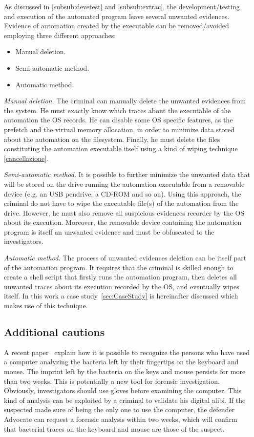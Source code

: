 \documentclass[runningheads,english]{llncs}
\begin{document}
{As discussed in \ref{subsub:devetest} and \ref{subsub:extrac}, the development/testing and execution of the automated program leave several unwanted evidences. Evidence of automation created by the executable can be removed/avoided employing three different approaches:
\begin{itemize}
\item Manual deletion.
\item Semi-automatic method.
\item Automatic method.
\end{itemize}

\noindent
{\em Manual deletion.} 
The criminal can manually delete the unwanted evidences from the system. He must exactly know which traces about the executable of the automation the OS records. He can disable some OS specific features, as the prefetch and the virtual memory allocation, in order to minimize data stored about the automation on the filesystem. Finally, he must delete the files constituting the automation executable itself using a kind of wiping technique \ref{cancellazione}.

\noindent
{\em Semi-automatic method.} %
It is possible to further minimize the unwanted data that will be stored on the drive running the automation executable from a removable device (e.g. an USB pendrive, a CD-ROM and so on). Using this approach, the criminal do not have to wipe the executable file(s) of the automation from the drive. However, he must also remove all suspicious evidences recorder by the OS about its execution. Moreover, the removable device containing the automation program is itself an unwanted evidence and must be obfuscated to the investigators. 

\noindent
{\em Automatic method.}
The process of unwanted evidences deletion can be itself part of the automation program. It requires that the criminal is skilled enough to create a shell script that firstly runs the automation program, then deletes all unwanted traces about its execution recorded by the OS, and eventually wipes itself. In this work a case study~\ref{sec:CaseStudy} is hereinafter discussed which makes use of this technique.

\subsection{Additional cautions}

A recent paper~\cite{bacterial} explain how it is possible to recognize the persons who have used a computer analyzing the bacteria left by their fingertips on the keyboard and mouse. The imprint left by the bacteria on the keys and mouse persists for more than two weeks. This is potentially a new tool for forensic investigation. Obviously, investigators should use gloves before examining the computer. This kind of analysis can be exploited by a criminal to validate his digital alibi.
If the suspected made sure of being the only one to use the computer, the defender Advocate can request a forensic analysis ​​within two weeks, which will confirm that bacterial traces on the keyboard and mouse are those of the suspect.

}
\end{document}
